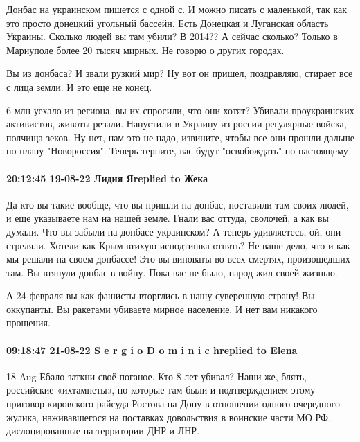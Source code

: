 Донбас на украинском пишется с одной с. И можно писать с маленькой, так как это
просто донецкий угольный бассейн. Есть Донецкая и Луганская область Украины.
Сколько людей вы там убили? В 2014?? А сейчас сколько? Только в Мариуполе более
20 тысяч мирных. Не говорю о других городах. 

Вы из донбаса? И звали рузкий мир? Ну вот он пришел, поздравляю, стирает все с
лица земли. И это еще не конец.

6 млн уехало из региона, вы их спросили, что они хотят? Убивали проукраинских
активистов, животы резали. Напустили в Украину из россии регулярные войска,
полчища зеков. Ну нет, нам это не надо, извините, чтобы все они прошли дальше
по плану "Новороссия". Теперь терпите, вас будут "освобождать" по настоящему

\paragraph{20:12:45 19-08-22 Лидия Яreplied to Жека}

Да кто вы такие вообще, что вы пришли на донбас, поставили там своих людей, и
еще указываете нам на нашей земле. Гнали вас оттуда, сволочей, а как вы думали.
Что вы забыли на донбасе украинском? А теперь удивляетесь, ой, они стреляли.
Хотели как Крым втихую исподтишка отнять? Не ваше дело, что и как мы решали на
своем донбассе! Это вы виноваты во всех смертях, произошедших там. Вы втянули
донбас в войну. Пока вас не было, народ жил своей жизнью.

А 24 февраля вы как фашисты вторглись в нашу суверенную страну! Вы оккупанты.
Вы ракетами убиваете мирное население. И нет вам никакого прощения.

\paragraph{09:18:47 21-08-22 S e r g i o D o m i n i c hreplied to Elena}

18 Aug
Ебало заткни своё поганое.
Кто 8 лет убивал?
Наши же, блять, российские «ихтамнеты», но которые там были и подтверждением этому приговор кировского райсуда Ростова на Дону в отношении одного очередного жулика, наживавшегося на поставках довольствия в воинские части МО РФ, дислоцированные на территории ДНР и ЛНР.
